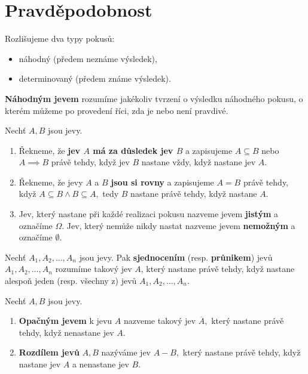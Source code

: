 \section{Pravděpodobnost}
\begin{pozn}
    Rozlišujeme dva typy pokusů:
   	\begin{itemize}
    \item náhodný (předem neznáme výsledek),
   	\item determinovaný (předem známe výsledek).
    \end{itemize}
\end{pozn}

\begin{definition}
    \textbf{Náhodným jevem} rozumíme jakékoliv tvrzení o výsledku náhodného pokusu,
    o kterém můžeme po provedení říci, zda je nebo není pravdivé.
\end{definition}

\begin{definition}
    Nechť $A,B$ jsou jevy.
    \begin{enumerate}[$i.$]
    \item Řekneme, že \textbf{jev $A$ má za důsledek jev $B$} a zapisujeme
    $A\subseteq B$ nebo $A\implies B$ právě tehdy, když jev $B$ nastane vždy, když
    nastane jev $A.$
   	\item Řekneme, že jevy $A$ a $B$ \textbf{jsou si rovny} a zapisujeme $A=B$ právě
    tehdy, když $A\subseteq B \land B\subseteq A,$ tedy $B$ nastane právě tehdy,
    když nastane $A.$
   	\item Jev, který nastane při každé realizaci pokusu nazveme jevem \textbf{jistým}
    a označíme $\Omega.$ Jev, který nemůže nikdy nastat nazveme jevem \textbf{nemožným}
    a označíme $\emptyset.$
    \end{enumerate}
\end{definition}

\begin{definition}
    Nechť $A_1, A_2, \dots, A_n$ jsou jevy. Pak \textbf{sjednocením} (resp. \textbf{
    průnikem}) jevů $A_1, A_2, \dots, A_n$ rozumíme takový jev $A$, který nastane
    právě tehdy, když nastane alespoň jeden (resp. všechny z) jevů $A_1, A_2,
    \dots, A_n$.
\end{definition}

\begin{definition}
    Nechť $A,B$ jsou jevy.
    \begin{enumerate}[$i.$]
    \item \textbf{Opačným jevem} k jevu $A$ nazveme takový jev $\overline A,$ který
    nastane právě tehdy, když nenastane jev $A.$
   	\item \textbf{Rozdílem jevů} $A,B$ nazýváme jev $A-B,$ který nastane právě tehdy,
    když nastane jev $A$ a nenastane jev $B$.
    \end{enumerate}
\end{definition}

